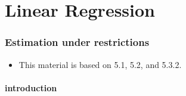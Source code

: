 

\part*{Linear Regression}%

\section{Estimation under restrictions}

\begin{itemize}
\item This material is based on \citet{Gre_2011} 5.1, 5.2, and 5.3.2.
\end{itemize}

\subsection{introduction}

